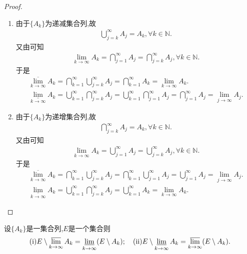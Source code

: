 \documentclass[../../main.tex]{subfiles}
\begin{document}
\begin{proof}
\begin{enumerate}
\item 由于$\{A_k\}$为递减集合列,故
\begin{align*}
\bigcup_{j=k}^{\infty}{A_j}=A_k,\forall k\in \mathbb{N} .
\end{align*}
又由可知
\begin{align*}
\underset{k\rightarrow \infty}{\lim}A_k=\bigcap_{j=1}^{\infty}{A_j}=\bigcap_{j=k}^{\infty}{A_j},\forall k\in \mathbb{N} .
\end{align*}
于是
\begin{gather*}
\underset{k\rightarrow \infty}{\overline{\lim }}A_k=\bigcap_{k=1}^{\infty}{\bigcup_{j=k}^{\infty}{A_j}}=\bigcap_{k=1}^{\infty}{A_k}=\underset{k\rightarrow \infty}{\lim}A_k.
\\
\underset{k\rightarrow \infty}{\underline{\lim }}A_k=\bigcup_{k=1}^{\infty}{\bigcap_{j=k}^{\infty}{A_j}}=\bigcup_{k=1}^{\infty}{\bigcap_{j=1}^{\infty}{A_j}}=\bigcap_{j=1}^{\infty}{A_j}=\underset{j\rightarrow \infty}{\lim}A_j.
\end{gather*}

\item 由于$\{A_k\}$为递增集合列,故
\begin{align*}
\bigcap_{j=k}^{\infty}{A_j}=A_k,\forall k\in \mathbb{N} .
\end{align*}
又由可知
\begin{align*}
\underset{k\rightarrow \infty}{\lim}A_k=\bigcup_{j=1}^{\infty}{A_j}=\bigcup_{j=k}^{\infty}{A_j},\forall k\in \mathbb{N} .
\end{align*}
于是
\begin{gather*}
\underset{k\rightarrow \infty}{\overline{\lim }}A_k=\bigcap_{k=1}^{\infty}{\bigcup_{j=k}^{\infty}{A_j}}=\bigcap_{k=1}^{\infty}{\bigcup_{j=1}^{\infty}{A_j}}=\bigcup_{j=1}^{\infty}{A_j}=\underset{j\rightarrow \infty}{\lim}A_j.
\\
\underset{k\rightarrow \infty}{\underline{\lim }}A_k=\bigcup_{k=1}^{\infty}{\bigcap_{j=k}^{\infty}{A_j}}=\bigcup_{k=1}^{\infty}{A_k}=\underset{k\rightarrow \infty}{\lim}A_k.
\end{gather*}
\end{enumerate}
\end{proof}

\begin{proposition}[上、下极限集的性质]\label{proposition:上、下极限集的性质}
  设\(\{A_k\}\)是一集合列,$E$是一个集合则
\begin{align*}
  (\text{i}) E\setminus\varlimsup_{k\rightarrow\infty}A_k=\varliminf_{k\rightarrow\infty}(E\setminus A_k);\quad (\text{ii}) E\setminus\varliminf_{k\rightarrow\infty}A_k=\varlimsup_{k\rightarrow\infty}(E\setminus A_k).
\end{align*}
\end{proposition}
\end{document}
